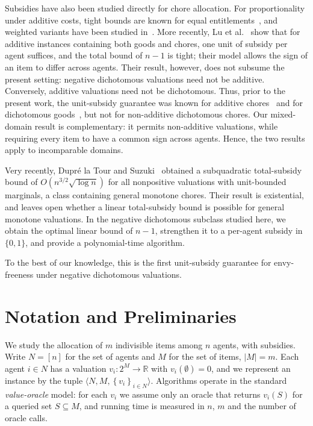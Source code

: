 \documentclass[11pt]{article}
\theoremstyle{plain}
\theoremstyle{plain}
\newcommand{\agents}{N}                       %
\newcommand{\items}{M}                        %
\newcommand{\R}{\mathbb{R}}
\newcommand{\set}[1]{\left\{#1\right\}}
\newcommand{\abs}[1]{\left\lvert#1\right\rvert}
\begin{document}
Subsidies have also been studied directly for chore allocation. For proportionality under additive costs, tight bounds are known for equal entitlements~\cite{wu2025revisiting}, and weighted variants have been studied in~\cite{wu2024tree,GSW25}. More recently, Lu et al.~\cite{LMS26} show that for additive instances containing both goods and chores, one unit of subsidy per agent suffices, and the total bound of $n-1$ is tight; their model allows the sign of an item to differ across agents. Their result, however, does not subsume the present setting: negative dichotomous valuations need not be additive. Conversely, additive valuations need not be dichotomous. Thus, prior to the present work, the unit-subsidy guarantee was known for additive chores~\cite{LMS26} and for dichotomous goods~\cite{BKNS22}, but not for non-additive dichotomous chores. Our mixed-domain result is complementary: it permits non-additive valuations, while requiring every item to have a common sign across agents. Hence, the two results apply to incomparable domains.

Very recently, Dupr\'e la Tour and Suzuki~\cite{la2026subquadratic} obtained a subquadratic total-subsidy bound of $O(n^{3/2}\sqrt{\log n})$ for all nonpositive valuations with unit-bounded
marginals, a class containing general monotone chores. Their result is existential, and leaves open whether a linear total-subsidy bound is possible for general monotone valuations. In the negative dichotomous subclass studied here, we obtain the optimal linear bound of $n-1$, strengthen it to a per-agent subsidy in $\{0,1\}$, and provide a polynomial-time algorithm.

To the best of our knowledge, this is the first unit-subsidy guarantee for envy-freeness under negative dichotomous valuations.

\section{Notation and Preliminaries}
\label{sec:prelim}

We study the allocation of $m$ indivisible items among $n$ agents, with
subsidies. Write $\agents = [n]$ for the set of agents and $\items$ for the set
of items, $\abs{\items} = m$. Each agent $i \in \agents$ has a valuation
$v_i : 2^{\items} \to \R$ with $v_i(\emptyset) = 0$, and we represent an
instance by the tuple $\langle \agents, \items, \set{v_i}_{i \in \agents}
\rangle$. Algorithms operate in the standard \emph{value-oracle} model: for each
$v_i$ we assume only an oracle that returns $v_i(S)$ for a queried set
$S \subseteq \items$, and running time is measured in $n$, $m$ and the number of
oracle calls.
\end{document}
